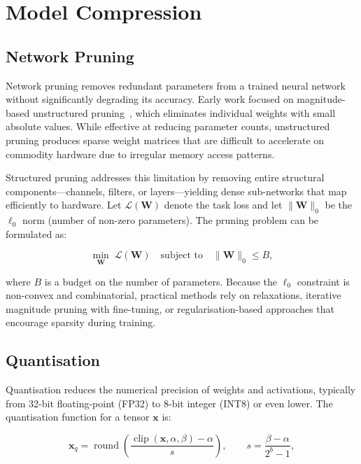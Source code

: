 \section{Model Compression}

\subsection{Network Pruning}

Network pruning removes redundant parameters from a trained neural
network without significantly degrading its accuracy. Early work
focused on magnitude-based unstructured pruning~\cite{goodfellow2016},
which eliminates individual weights with small absolute values.
While effective at reducing parameter counts, unstructured pruning
produces sparse weight matrices that are difficult to accelerate on
commodity hardware due to irregular memory access patterns.

Structured pruning addresses this limitation by removing entire
structural components---channels, filters, or layers---yielding dense
sub-networks that map efficiently to hardware. Let
$\mathcal{L}(\mathbf{W})$ denote the task loss and let
$\|\mathbf{W}\|_0$ be the $\ell_0$ norm (number of non-zero
parameters). The pruning problem can be formulated as:

\begin{equation}
\min_{\mathbf{W}} \; \mathcal{L}(\mathbf{W})
\quad\text{subject to}\quad
\|\mathbf{W}\|_0 \leq B,
\label{eq:pruning}
\end{equation}

where $B$ is a budget on the number of parameters. Because the $\ell_0$
constraint is non-convex and combinatorial, practical methods rely on
relaxations, iterative magnitude pruning with fine-tuning, or
regularisation-based approaches that encourage sparsity during training.

\subsection{Quantisation}

Quantisation reduces the numerical precision of weights and
activations, typically from 32-bit floating-point (FP32) to 8-bit
integer (INT8) or even lower. The quantisation function for a tensor
$\mathbf{x}$ is:

\begin{equation}
\mathbf{x}_q = \operatorname{round}\!\left(
\frac{\operatorname{clip}(\mathbf{x}, \alpha, \beta) - \alpha}{s}
\right),
\qquad s = \frac{\beta - \alpha}{2^b - 1},
\label{eq:quant}
\end{equation}

